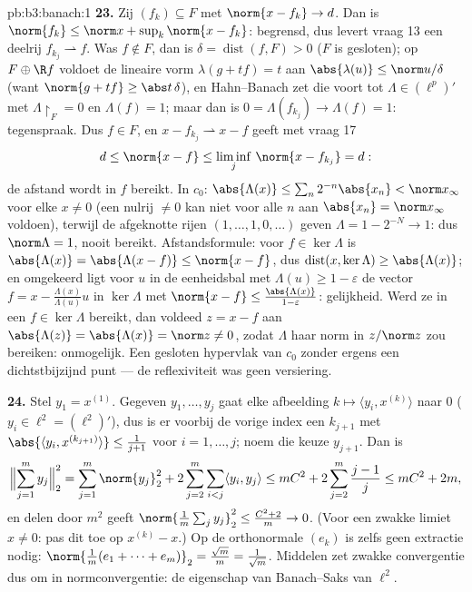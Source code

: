 \begin{solution}{pb:b3:banach:1}
\textbf{23.} Zij $(f_k) \subseteq F$ met $\norm{x - f_k} \to d$.
Dan is $\norm{f_k} \leq \norm x + \sup_k\norm{x - f_k}$:
begrensd, dus levert vraag 13 een deelrij $f_{k_j}
\rightharpoonup f$. Was $f \notin F$, dan is $\delta =
\operatorname{dist}(f, F) > 0$ ($F$ is gesloten); op $F \oplus \R
f$ voldoet de lineaire vorm $\lambda(g + tf) = t$ aan
$\abs{\lambda(u)} \leq \norm u/\delta$ (want $\norm{g + tf} \geq
\abs t\,\delta$), en Hahn--Banach zet die voort tot $\Lambda \in
(\ell^p)'$ met $\Lambda\restriction_F = 0$ en $\Lambda(f) = 1$;
maar dan is $0 = \Lambda(f_{k_j}) \to \Lambda(f) = 1$:
tegenspraak. Dus $f \in F$, en $x - f_{k_j} \rightharpoonup x - f$
geeft met vraag 17
\[
d \leq \norm{x - f} \leq \liminf_j\,\norm{x - f_{k_j}} = d :
\]
de afstand wordt in $f$ bereikt. In $c_0$: $\abs{\Lambda(x)} \leq
\sum_n2^{-n}\abs{x_n} < \norm x_\infty$ voor elke $x \neq 0$ (een
nulrij $\neq 0$ kan niet voor alle $n$ aan $\abs{x_n} = \norm
x_\infty$ voldoen), terwijl de afgeknotte rijen $(1, \dots, 1, 0,
\dots)$ geven $\Lambda = 1 - 2^{-N} \to 1$: dus $\norm\Lambda =
1$, nooit bereikt. Afstandsformule: voor $f \in \ker\Lambda$ is
$\abs{\Lambda(x)} = \abs{\Lambda(x - f)} \leq \norm{x - f}$, dus
$\operatorname{dist}(x, \ker\Lambda) \geq \abs{\Lambda(x)}$; en
omgekeerd ligt voor $u$ in de eenheidsbal met $\Lambda(u) \geq 1 -
\varepsilon$ de vector $f = x - \frac{\Lambda(x)}{\Lambda(u)}u$ in
$\ker\Lambda$ met $\norm{x - f} \leq \frac{\abs{\Lambda(x)}}{1 -
\varepsilon}$: gelijkheid. Werd ze in een $f \in \ker\Lambda$
bereikt, dan voldeed $z = x - f$ aan $\abs{\Lambda(z)} =
\abs{\Lambda(x)} = \norm z \neq 0$, zodat $\Lambda$ haar norm in
$z/\norm z$ zou bereiken: onmogelijk. Een gesloten hypervlak van
$c_0$ zonder ergens een dichtstbijzijnd punt --- de reflexiviteit
was geen versiering.

\textbf{24.} Stel $y_1 = x^{(1)}$. Gegeven $y_1, \dots, y_j$ gaat
elke afbeelding $k \mapsto \langle y_i, x^{(k)}\rangle$ naar $0$
($y_i \in \ell^2 = (\ell^2)'$), dus is er voorbij de vorige index
een $k_{j+1}$ met $\abs{\langle y_i, x^{(k_{j+1})}\rangle} \leq
\frac1{j+1}$ voor $i = 1, \dots, j$; noem die keuze $y_{j+1}$. Dan
is
\[
\Bigl\lVert\sum_{j=1}^my_j\Bigr\rVert_2^2
= \sum_{j=1}^m\norm{y_j}_2^2
+ 2\sum_{j=2}^m\sum_{i<j}\langle y_i, y_j\rangle
\leq mC^2 + 2\sum_{j=2}^m\frac{j-1}j
\leq mC^2 + 2m,
\]
en delen door $m^2$ geeft $\norm{\frac1m\sum_jy_j}_2^2 \leq
\frac{C^2 + 2}m \to 0$. (Voor een zwakke limiet $x \neq 0$: pas
dit toe op $x^{(k)} - x$.) Op de orthonormale $(e_k)$ is zelfs
geen extractie nodig: $\norm{\frac1m(e_1 + \dots + e_m)}_2 =
\frac{\sqrt m}m = \frac1{\sqrt m}$. Middelen zet zwakke
convergentie dus om in normconvergentie: de eigenschap van
Banach--Saks van $\ell^2$.


\end{solution}
